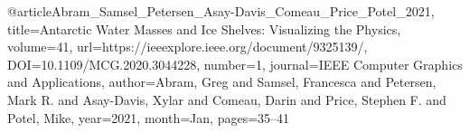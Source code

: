@article{Abram_Samsel_Petersen_Asay-Davis_Comeau_Price_Potel_2021, 
    title={Antarctic Water Masses and Ice Shelves: Visualizing the Physics}, 
    volume={41}, 
    url={https://ieeexplore.ieee.org/document/9325139/}, 
    DOI={10.1109/MCG.2020.3044228}, 
    number={1}, 
    journal={IEEE Computer Graphics and Applications}, 
    author={Abram, Greg and Samsel, Francesca and Petersen, Mark R. and Asay-Davis, Xylar and Comeau, Darin and Price, Stephen F. and Potel, Mike}, 
    year={2021}, 
    month={Jan}, 
    pages={35–41} 
}
